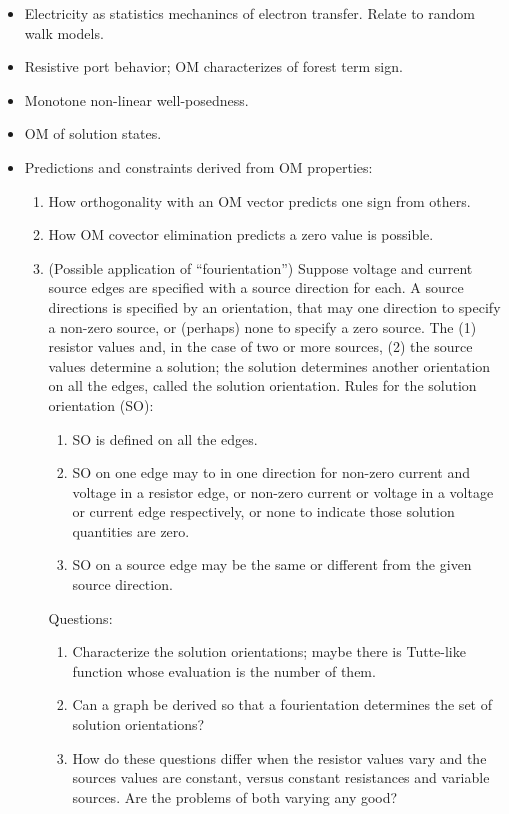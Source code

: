 \documentclass{article}
\begin{document}
\begin{itemize}
\item Electricity as statistics mechanincs of electron transfer.  Relate to 
  random walk models.

\item Resistive port behavior; OM characterizes of 
forest term sign.
\item Monotone non-linear well-posedness.
\item OM of solution states.
\item Predictions and constraints derived from OM properties:
\begin{enumerate}
\item How orthogonality with an OM vector predicts one sign from others.
\item How OM covector elimination predicts a zero value is possible.
\item (Possible application of ``fourientation'') 
Suppose voltage and current source edges are specified with a source 
direction for each.  A source directions is specified by an orientation, that
may one direction to specify a non-zero source, or (perhaps) none to specify a
zero source.  The (1) resistor values and, in the case of two or more sources,
(2) the source values determine a solution; the solution determines another 
orientation on all the edges, called the solution orientation.  Rules for the
solution orientation (SO):
\begin{enumerate}
\item SO is defined on all the edges.
\item SO on one edge may to in one direction for non-zero current and voltage 
in a resistor edge, or non-zero current or voltage in a voltage or current edge
respectively, or none to indicate those solution quantities are zero.
\item SO on a source edge may be the same or different from the given source 
direction.
\end{enumerate}
Questions:
\begin{enumerate}
\item Characterize the solution orientations; maybe there is Tutte-like function
whose evaluation is the number of them.
\item Can a graph be derived so that a fourientation determines the set of 
solution orientations?  
\item How do these questions differ when the resistor values vary and the 
sources values are constant, versus constant resistances and variable sources.
Are the problems of both varying any good?

\end{enumerate}
\end{enumerate}
\end{itemize}
\end{document}

